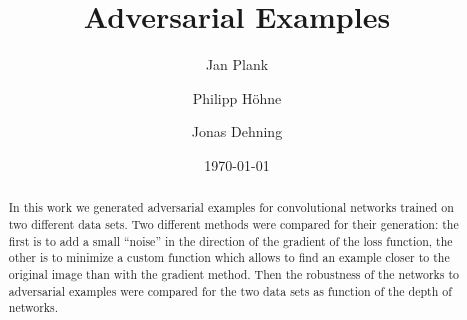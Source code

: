 \documentclass[%
 reprint,
 amsmath,amssymb,
 aps,
]{revtex4-1}
\begin{document}

\title{Adversarial Examples}%

\author{Jan Plank}
\author{Philipp Höhne}%
%


\author{Jonas Dehning}
%

\date{\today}%

\begin{abstract}
In this work we generated adversarial examples for convolutional networks trained on two different data sets. Two different methods were compared for their generation: the first is to add a small ``noise'' in the direction of the gradient of the loss function, the other is to minimize a custom function which allows to find an example closer to the original image than with the gradient method. Then the robustness of the networks to adversarial examples were compared for the two data sets as function of the depth of networks.


\end{abstract}

\maketitle
\end{document}

